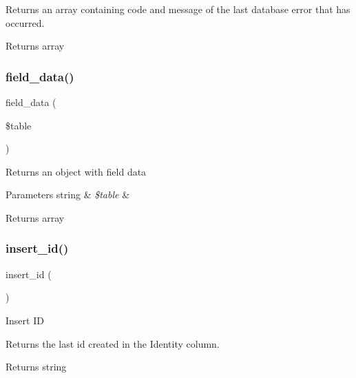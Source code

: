 Returns an array containing code and message of the last database error that has occurred.

\begin{DoxyReturn}{Returns}
array 
\end{DoxyReturn}
\mbox{\label{class_c_i___d_b__mssql__driver_a90355121e1ed009e0efdbd544ab56efa}} 
\subsubsection{\texorpdfstring{field\+\_\+data()}{field\_data()}}
{\footnotesize\ttfamily field\+\_\+data (\begin{DoxyParamCaption}\item[{}]{\$table }\end{DoxyParamCaption})}

Returns an object with field data


\begin{DoxyParams}[1]{Parameters}
string & {\em \$table} & \\
\hline
\end{DoxyParams}
\begin{DoxyReturn}{Returns}
array 
\end{DoxyReturn}
\mbox{\label{class_c_i___d_b__mssql__driver_a933f2cde8dc7f87875e257d0a4902e99}} 
\subsubsection{\texorpdfstring{insert\+\_\+id()}{insert\_id()}}
{\footnotesize\ttfamily insert\+\_\+id (\begin{DoxyParamCaption}{ }\end{DoxyParamCaption})}

Insert ID

Returns the last id created in the Identity column.

\begin{DoxyReturn}{Returns}
string 
\end{DoxyReturn}


